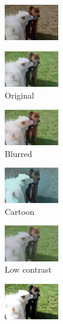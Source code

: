 \begin{figure}[ht]
\begin{subfigure}[b]{0.1\textwidth}
		\end{subfigure}
		\hfill
		\begin{subfigure}[b]{0.1\textwidth}
			\includegraphics[width=2.4cm]{orig - filter - lumin (2).jpeg}
			
		\end{subfigure}
	
		\vspace{0.1cm}	
	    \begin{subfigure}[b]{0.1\textwidth}
			\centering
			\includegraphics[width=2.4cm]{c - filter.jpeg}
		\caption{Original}
		\end{subfigure}
		\hfill
		\begin{subfigure}[b]{0.1\textwidth}
			\includegraphics[width=2.4cm]{c - filter - blurr.jpeg}
			\caption{Blurred}
		\end{subfigure}
		\hfill
		\begin{subfigure}[b]{0.1\textwidth}
			\includegraphics[width=2.4cm]{c - filter - cartoon.jpeg}
			\caption{Cartoon}
		\end{subfigure}
		\hfill
		\begin{subfigure}[b]{0.1\textwidth}
			\includegraphics[width=2.4cm]{c - filter - man contr (1).jpg}
			\caption{Low contrast}
		\end{subfigure}
		\hfill
		\begin{subfigure}[b]{0.1\textwidth}
			\includegraphics[width=2.4cm]{c - filter - man contr (2).jpg}

\end{subfigure}
\end{figure}
